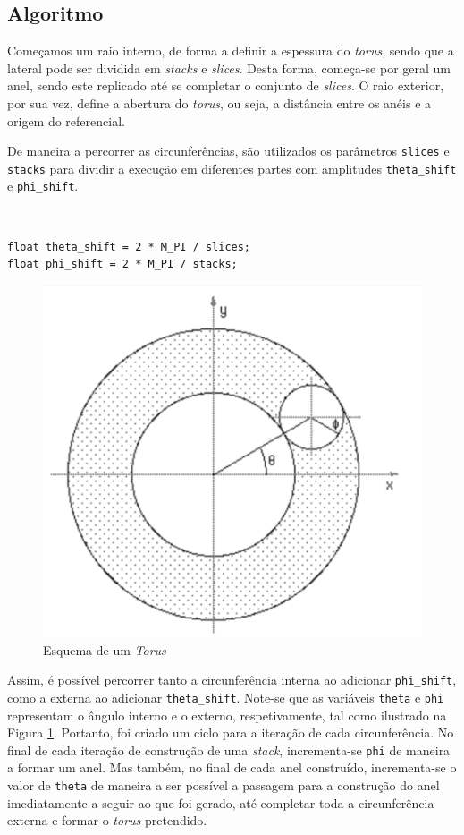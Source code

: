 \documentclass[a4paper, 11pt]{article}
\begin{document}
\subsection*{Algoritmo}

Começamos um raio interno, de forma a definir a espessura do \textit{torus}, sendo
que a lateral pode ser dividida em \textit{stacks} e \textit{slices}. Desta forma,
começa-se por geral um anel, sendo este replicado até se completar o conjunto de
\textit{slices}. O raio exterior, por sua vez, define a abertura do \textit{torus},
ou seja, a distância entre os anéis e a origem do referencial.

De maneira a percorrer as circunferências, são utilizados os parâmetros \texttt{slices}
e \texttt{stacks} para dividir a execução em diferentes partes com amplitudes
\texttt{theta\_shift} e \texttt{phi\_shift}.

\

\begin{verbatim}
float theta_shift = 2 * M_PI / slices;
float phi_shift = 2 * M_PI / stacks;
\end{verbatim}

\pagebreak

\begin{figure}
    \centering
    \includegraphics[width=.48\textwidth]{img/torus_2.png}
    \caption{Esquema de um \textit{Torus}}
    \label{fig:torus}
\end{figure}

Assim, é possível percorrer tanto a circunferência interna ao adicionar \texttt{phi\_shift},
como a externa ao adicionar \texttt{theta\_shift}. Note-se que as variáveis \texttt{theta}
e \texttt{phi} representam o ângulo interno e o externo, respetivamente, tal como
ilustrado na Figura \ref{fig:torus}. Portanto, foi criado um ciclo para a iteração
de cada circunferência. No final de cada iteração de construção de uma \textit{stack},
incrementa-se \texttt{phi} de maneira a formar um anel. Mas também, no final de
cada anel construído, incrementa-se o valor de \texttt{theta} de maneira a ser
possível a passagem para a construção do anel imediatamente a seguir ao que foi
gerado, até completar toda a circunferência externa e formar o \textit{torus}
pretendido.
\end{document}
